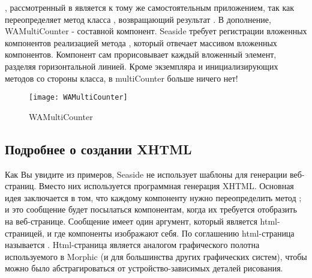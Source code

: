 \documentclass[a4paper,10pt,twoside]{book}
\begin{document}
, рассмотренный в  является к тому же
самостоятельным приложением, так как
переопределяет метод класса ,
возвращающий результат .
В дополнение, WAMultiCounter - составной компонент.
Seaside требует регистрации вложенных компонентов
реализацией метода ,
который отвечает массивом вложенных компонентов.
Компонент сам прорисовывает каждый вложенный элемент,
разделяя горизонтальной линией.
Кроме экземпляра и инициализирующих методов со стороны класса,
в multiCounter больше ничего нет!

\begin{figure}[bht]
\begin{center}
\texttt{[image: WAMultiCounter]}
\caption{WAMultiCounter}
\end{center}
\end{figure}

\subsection{Подробнее о создании XHTML}


Как Вы увидите из примеров, Seaside не использует шаблоны
для генерации веб-страниц.
Вместо них используется программная генерация XHTML.
Основная идея заключается в том,
что каждому компоненту нужно переопределить метод
;
и это сообщение будет посылаться компонентам,
когда их требуется отобразить на веб-странице.
Сообщение  имеет один аргумент,
который является   html-страницей,
и где компоненты изображают себя.
По соглашению html-страница называется .
Html-страница является аналогом графического полотна
используемого в Morphic
(и для большинства других графических систем),
чтобы можно было абстрагироваться от устройство-зависимых
деталей рисования.
\end{document}
